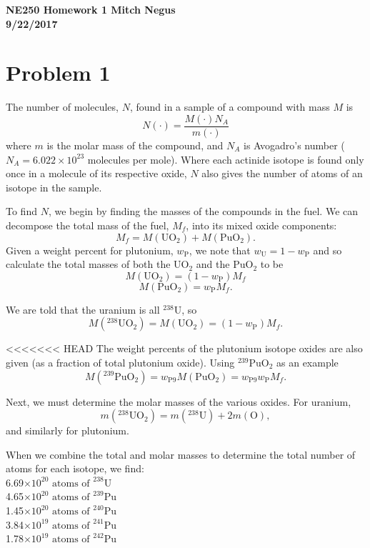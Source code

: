 \documentclass{article}
\newcommand{\tab}{\-\hspace{1cm}}
\begin{document}
\thispagestyle{empty}

{\bf {\large {NE250 Homework {1} \hfill Mitch Negus\\
		\hspace*{\fill} 9/22/2017\\ }}}
		

\section*{Problem 1}

The number of molecules, $N$, found in a sample of a compound with mass $M$ is 
$$ N(\cdot) = \frac{M(\cdot) N_A}{m(\cdot)} $$
where $m$ is the molar mass of the compound, and $N_A$ is Avogadro's number ($N_A = 6.022 \times 10^{23}$ molecules per mole). Where each actinide isotope is found only once in a molecule of its respective oxide, $N$ also gives the number of atoms of an isotope in the sample. 

To find $N$, we begin by finding the masses of the compounds in the fuel. We can decompose the total mass of the fuel, $M_f$, into its mixed oxide components:
$$ M_f = M(\text{UO}_2) + M(\text{PuO}_2). $$
Given a weight percent for plutonium, $w_{\text{P}}$, we note that $w_{\text{U}} = 1-w_{\text{P}}$ and so calculate the total masses of both the UO$_2$ and the PuO$_2$ to be
$$ M(\text{UO}_2) = (1-w_{\text{P}})M_f	$$
$$ M(\text{PuO}_2) = w_{\text{P}}M_f. $$

We are told that the uranium is all $^{238}$U, so 
$$ M(^{238}\text{UO}_2) = M(\text{UO}_2) = (1-w_{\text{P}})M_f. $$

<<<<<<< HEAD
The weight percents of the plutonium isotope oxides are also given (as a fraction of total plutonium oxide). Using $^{239}\text{PuO}_2$ as an example
$$ M(^{239}\text{PuO}_2) = w_{\text{P}9}M(\text{PuO}_2) = w_{\text{P}9}w_{\text{P}}M_f. $$


Next, we must determine the molar masses of the various oxides. For uranium,
$$ m(^{238}\text{UO}_2) = m(^{238}\text{U}) + 2m(\text{O}), $$
and similarly for plutonium.

When we combine the total and molar masses to determine the total number of atoms for each isotope, we find:\\
\tab 6.69$\times 10^{20} \text{ atoms of }^{238}$U	\\
\tab 4.65$\times 10^{20} \text{ atoms of }^{239}$Pu	\\
\tab 1.45$\times 10^{20} \text{ atoms of }^{240}$Pu	\\
\tab 3.84$\times 10^{19} \text{ atoms of }^{241}$Pu	\\
\tab 1.78$\times 10^{19} \text{ atoms of }^{242}$Pu	\\
\end{document}
